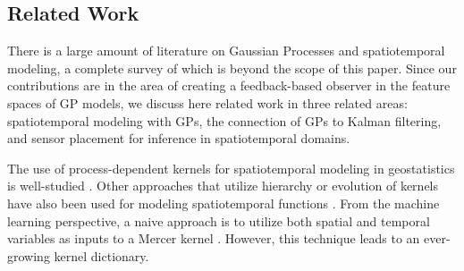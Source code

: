 \subsection{Related Work}\label{sec:related}
There is a large amount of literature on Gaussian Processes and spatiotemporal modeling, a complete survey of which is beyond the scope of this paper. Since our contributions are in the area of creating a feedback-based observer in the feature spaces of GP models, we discuss here related work in three related areas: spatiotemporal modeling with GPs, the connection of GPs to Kalman filtering, and sensor placement for inference in spatiotemporal domains.
 
The use of process-dependent kernels for spatiotemporal modeling in geostatistics is well-studied \cite{wikle2002kernel,cressie2011statistics,stroud2001dynamic}. Other approaches that utilize hierarchy or evolution of kernels have also been used for modeling spatiotemporal functions \cite{hartikainen2013sequential,lindgren2011explicit,ho1996multiresolution}.
From the machine learning perspective, a naive approach is to utilize both spatial and temporal variables as inputs to a Mercer kernel \cite{perez2013gaussian}. However, this technique leads to an ever-growing kernel dictionary. %
